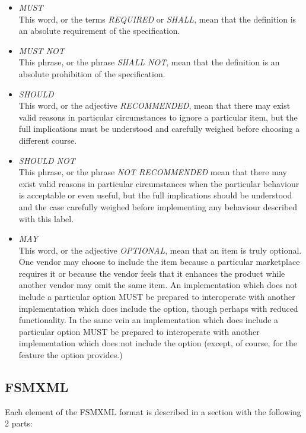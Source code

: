 \documentclass[a4paper]{article}
\begin{document}
\begin{itemize}
  \item \emph{MUST}\\This word, or the terms \emph{REQUIRED} or \emph{SHALL},
mean that the definition is an absolute requirement of the specification.

  \item \emph{MUST NOT}\\This phrase, or the phrase \emph{SHALL NOT}, mean that
the definition is an absolute prohibition of the specification.

  \item \emph{SHOULD}\\This word, or the adjective \emph{RECOMMENDED}, mean
that there may exist valid reasons in particular circumstances to ignore
a particular item, but the full implications must be understood and
carefully weighed before choosing a different course.

  \item \emph{SHOULD NOT}\\This phrase, or the phrase \emph{NOT RECOMMENDED}
mean that there may exist valid reasons in particular circumstances when
the particular behaviour is acceptable or even useful, but the full
implications should be understood and the case carefully weighed
before implementing any behaviour described with this label.

  \item \emph{MAY}\\This word, or the adjective \emph{OPTIONAL}, mean that an
item is truly optional.  One vendor may choose to include the item because
a particular marketplace requires it or because the vendor feels that
it enhances the product while another vendor may omit the same item.
An implementation which does not include a particular option MUST be
prepared to interoperate with another implementation which does
include the option, though perhaps with reduced functionality. In the
same vein an implementation which does include a particular option
MUST be prepared to interoperate with another implementation which
does not include the option (except, of course, for the feature the
option provides.)
\end{itemize}

\subsection{FSMXML}

Each element of the FSMXML format is described in a section with the following
2 parts:
\end{document}
